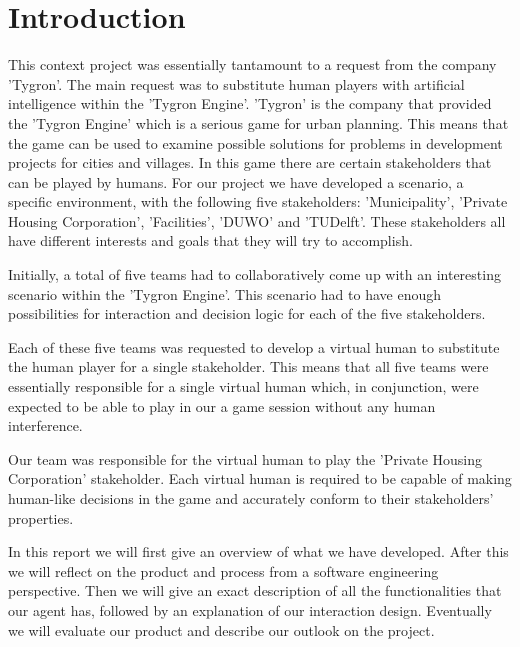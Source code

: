 \chapter*{Introduction}
This context project was essentially tantamount to a request from the company 'Tygron'. The main request was to substitute human players with artificial intelligence within the 'Tygron Engine'. 'Tygron' is the company that provided the 'Tygron Engine' which is a serious game for urban planning. This means that the game can be used to examine possible solutions for problems in development projects for cities and villages. In this game there are certain stakeholders that can be played by humans. For our project we have developed a scenario, a specific environment, with the following five stakeholders: 'Municipality', 'Private Housing Corporation', 'Facilities', 'DUWO' and 'TUDelft'. These stakeholders all have different interests and goals that they will try to accomplish. 

Initially, a total of five teams had to collaboratively come up with an interesting scenario within the 'Tygron Engine'. This scenario had to have enough possibilities for interaction and decision logic for each of the five stakeholders. 

Each of these five teams was requested to develop a virtual human to substitute the human player for a single stakeholder. This means that all five teams were essentially responsible for a single virtual human which, in conjunction, were expected to be able to play in our a game session without any human interference. 

Our team was responsible for the virtual human to play the 'Private Housing Corporation' stakeholder. Each virtual human is required to be capable of making human-like decisions in the game and accurately conform to their stakeholders' properties. 

In this report we will first give an overview of what we have developed. After this we will reflect on the product and process from a software engineering perspective. Then we will give an exact description of all the functionalities that our agent has, followed by an explanation of our interaction design. Eventually we will evaluate our product and describe our outlook on the project.
\newpage
